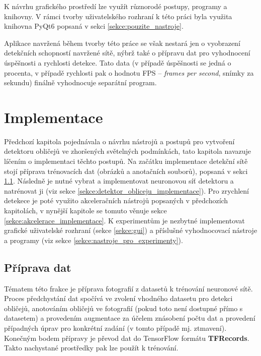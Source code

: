 K návrhu grafického prostředí lze využít různorodé postupy, programy a knihovny. V rámci tvorby uživatelského rozhraní k této práci byla využita knihovna PyQt6 popsaná v sekci \ref{sekce:pouzite_nastroje}.

Aplikace navržená během tvorby této práce se však nestará jen o vyobrazení detekčních schopností navržené sítě, nýbrž také o přípravu dat pro vyhodnocení úspěšnosti a rychlosti detekce. Tato data (v případě úspěšnosti se jedná o procenta, v případě rychlosti pak o hodnotu FPS -- \emph{frames per second}, snímky za sekundu) finálně vyhodnocuje separátní program.

\chapter{Implementace}
\label{kapitola:implementace}
Předchozí kapitola pojednávala o návrhu nástrojů a postupů pro vytvoření detektoru obličejů ve zhoršených světelných podmínkách, tato kapitola navazuje líčením o implementaci těchto postupů. Na začátku implementace detekční sítě stojí příprava trénovacích dat (obrázků a anotačních souborů), popsaná v sekci \ref{sekce:priprava_dat}. Následně je nutné vybrat a implementovat neuronovou síť detektoru a natrénovat ji (viz sekce \ref{sekce:detektor_obliceju_implementace}). Pro zrychlení detekece je poté využito akceleračních nástrojů popsaných v předchozích kapitolách, v nynější kapitole se tomuto věnuje sekce \ref{sekce:akcelerace_implementace}. K experimentům je nezbytné implementovat grafické uživatelské rozhraní (sekce \ref{sekce:gui}) a příslušné vyhodnocovací nástroje a programy (viz sekce \ref{sekce:nastroje_pro_experimenty}).

\section{Příprava dat}
\label{sekce:priprava_dat}
Tématem této frakce je příprava fotografií z datasetů k trénování neuronové sítě. Proces předchystání dat spočívá ve zvolení vhodného datasetu pro detekci obličejů, anotováním obličejů ve fotografií (pokud toto není dostupné přímo s datasetem) a provedením augmentace za účelem znásobení počtu dat a provedení případných úprav pro konkrétní zadání (v tomto případě mj. ztmavení). Konečným bodem přípravy je převod dat do TensorFlow formátu \textbf{TFRecords}. Takto nachystané prostředky pak lze použít k trénování.


